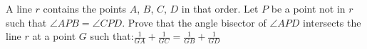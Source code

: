 A line $r$ contains the points $A$,  $B$,  $C$,  $D$ in that order. Let $P$ be a point not in $r$ such that $\angle{APB} = \angle{CPD}$. Prove that the angle bisector of $\angle{APD}$ intersects the line $r$ at a point $G$ such that:$\frac{1}{GA} + \frac{1}{GC} = \frac{1}{GB} + \frac{1}{GD}$